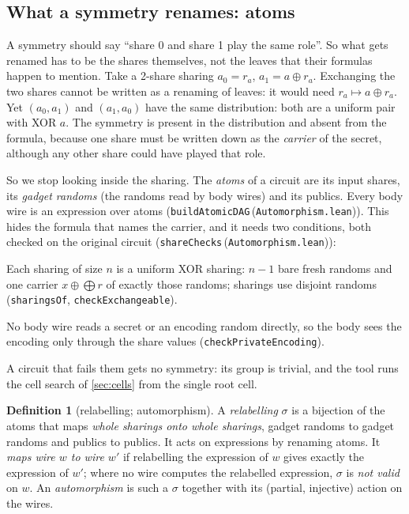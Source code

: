 \documentclass[11pt,a4paper]{article}
\theoremstyle{definition}
\newtheorem{definition}[theorem]{Definition}
\theoremstyle{remark}
\newcommand{\code}[1]{\texttt{\small #1}}
\newcommand{\lean}[2]{\code{#1}\,(\code{#2})}
\begin{document}
\subsection{What a symmetry renames: atoms}\label{sec:atoms}

A symmetry should say ``share 0 and share 1 play the same role''.  So what gets renamed has to
be the shares themselves, not the leaves that their formulas happen to mention.  Take a 2-share
sharing $a_0 = r_a$, $a_1 = a\oplus r_a$.  Exchanging the two shares cannot be written as a
renaming of leaves: it would need $r_a\mapsto a\oplus r_a$.  Yet $(a_0,a_1)$ and $(a_1,a_0)$ have
the same distribution: both are a uniform pair with XOR $a$.  The symmetry is present in the
distribution and absent from the formula, because one share must be written down as the
\emph{carrier} of the secret, although any other share could have played that role.

So we stop looking inside the sharing.  The \emph{atoms} of a circuit are its input shares, its
\emph{gadget randoms} (the randoms read by body wires) and its publics.  Every body wire is an
expression over atoms (\lean{buildAtomicDAG}{Automorphism.lean}).  This hides the formula that
names the carrier, and it needs two conditions, both checked on the original circuit
(\lean{shareChecks}{Automorphism.lean}):
\begin{description}[leftmargin=*,font=\normalfont]
\item[(S1)] Each sharing of size $n$ is a uniform XOR sharing: $n-1$ bare fresh randoms and one
  carrier $x\oplus\bigoplus r$ of exactly those randoms; sharings use disjoint randoms
  (\code{sharingsOf}, \code{checkExchangeable}).
\item[(S2)] No body wire reads a secret or an encoding random directly, so the body sees the
  encoding only through the share values (\code{checkPrivateEncoding}).
\end{description}
A circuit that fails them gets no symmetry: its group is trivial, and the tool runs the cell
search of \cref{sec:cells} from the single root cell.

\begin{definition}[relabelling; automorphism]\label{def:relabelling}
A \emph{relabelling} $\sigma$ is a bijection of the atoms that maps \emph{whole sharings onto
whole sharings}, gadget randoms to gadget randoms and publics to publics.  It acts on expressions
by renaming atoms.  It \emph{maps wire $w$ to wire $w'$} if relabelling the expression of $w$
gives exactly the expression of $w'$; where no wire computes the relabelled expression, $\sigma$
is \emph{not valid} on $w$.  An \emph{automorphism} is such a $\sigma$ together with its (partial,
injective) action on the wires.
\end{definition}
\end{document}
